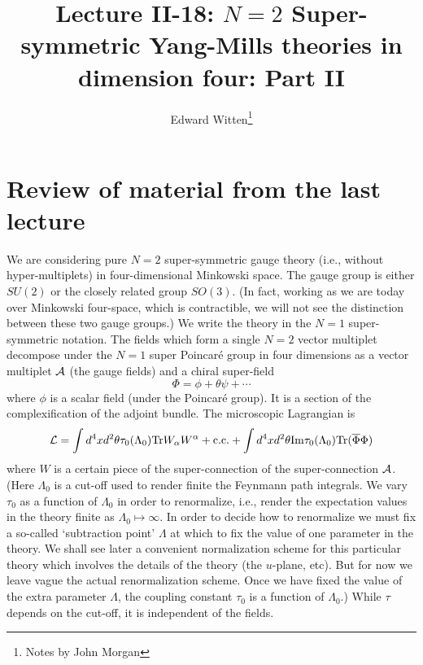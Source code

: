 \documentclass[10pt]{article}
\title{Lecture II-18: $N=2$ Super-symmetric Yang-Mills theories in
dimension four: Part II}
\author{Edward Witten\thanks{Notes by John Morgan}}
\date{}
\begin{document}
\maketitle


\section{Review of material from the last lecture}

We are considering pure $N=2$
super-symmetric gauge theory (i.e.,  
without hyper-multiplets) in four-dimensional Minkowski space.  The
gauge group is either $SU(2)$ or the 
closely related group $SO(3)$. 
(In fact, working as we are today over Minkowski four-space, which is
contractible, we 
will not see the distinction between these two gauge groups.)
We write the theory in the $N=1$
super-symmetric notation. The fields which form a single $N=2$ vector
multiplet decompose under the $N=1$ super Poincar\'e group in four
dimensions as a vector  
multiplet ${\cal A}$ (the gauge fields) and a chiral super-field
$$\Phi=\phi+\theta\psi+\cdots$$
where $\phi$ is a scalar field (under the Poincar\'e group).
It is a section of the complexification of the adjoint bundle.
The microscopic Lagrangian is
$${\cal L}=\int d^4xd^2\theta\tau_0(\Lambda_0){\rm
Tr}W_\alpha W^\alpha+{\rm c.c.} +\int d^4xd^2\theta {\rm
Im}\tau_0(\Lambda_0) {\rm Tr}(\overline\Phi\Phi)$$
where $W$ is a certain piece of the super-connection of the
super-connection ${\cal A}$. 
(Here $\Lambda_0$ is a cut-off used to render finite the Feynmann path
integrals. We  vary $\tau_0$ as a function of $\Lambda_0$ in
order to renormalize, i.e., render the expectation values in the
theory finite as $\Lambda_0\mapsto\infty$. In order to decide how to
renormalize we must fix a 
so-called `subtraction point' $\Lambda$ at which to fix the value of
one parameter in the theory.  We shall see later a convenient
normalization scheme for this particular theory which involves the
details of the theory (the $u$-plane, etc).  But for now we leave
vague the actual renormalization scheme. Once we have fixed the value
of the extra parameter $\Lambda$, the coupling constant $\tau_0$
is a function of $\Lambda_0$.)   While $\tau$ depends
on the cut-off, it is 
independent of the fields. 
\end{document}
